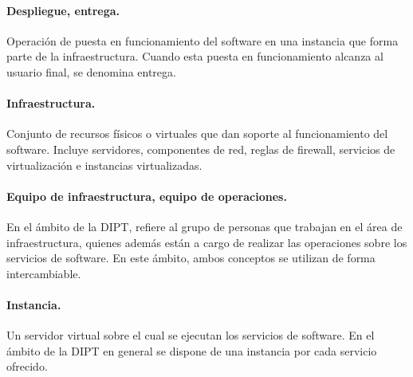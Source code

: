 \paragraph{Despliegue, entrega.} Operación de puesta en funcionamiento
del software en una instancia que forma parte de la
infraestructura. Cuando esta puesta en funcionamiento alcanza al
usuario final, se denomina entrega.

\paragraph{Infraestructura.} Conjunto de recursos físicos o virtuales que
dan soporte al funcionamiento del software. Incluye servidores,
componentes de red, reglas de firewall, servicios de virtualización e
instancias virtualizadas.

\paragraph{Equipo de infraestructura, equipo de operaciones.} En el
ámbito de la DIPT, refiere al grupo de personas que trabajan en el
área de infraestructura, quienes además están a cargo de realizar las
operaciones sobre los servicios de software. En este ámbito, ambos
conceptos se utilizan de forma intercambiable.

\paragraph{Instancia.} Un servidor virtual sobre el cual se ejecutan los
servicios de software. En el ámbito de la DIPT en general se dispone
de una instancia por cada servicio ofrecido.
